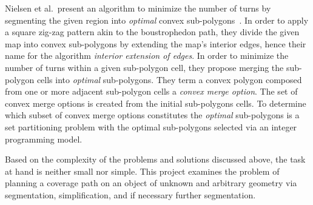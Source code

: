 Nielsen et al.\ present an algorithm to minimize the number of turns by segmenting the given region into \textit{optimal} convex sub-polygons~\cite{IntEdgeExt}.
In order to apply a square zig-zag pattern akin to the boustrophedon path, they divide the given map into convex sub-polygons by extending the map's interior edges, hence their name for the algorithm \textit{interior extension of edges}.
In order to minimize the number of turns within a given sub-polygon cell, they propose merging the sub-polygon cells into \textit{optimal} sub-polygons.
They term a convex polygon composed from one or more adjacent sub-polygon cells a \textit{convex merge option}.
The set of convex merge options is created from the initial sub-polygons cells.
To determine which subset of convex merge options constitutes the \textit{optimal} sub-polygons is a set partitioning problem with the optimal sub-polygons selected via an integer programming model.


Based on the complexity of the problems and solutions discussed above, the task at hand is neither small nor simple.
This project examines the problem of planning a coverage path on an object of unknown and arbitrary geometry via segmentation, simplification, and if necessary further segmentation.

